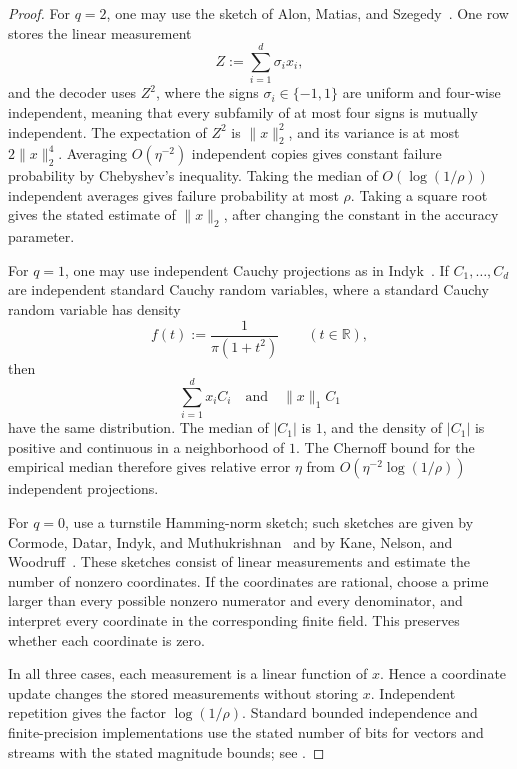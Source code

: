 \documentclass[11pt]{article}
\theoremstyle{definition}
\newcommand{\R}{\mathbb{R}}
\begin{document}
\begin{proof}
For \(q=2\), one may use the sketch of Alon, Matias, and
Szegedy~\cite{AlonMatiasSzegedy1999}.  One row stores the linear measurement
\[
 Z:=\sum_{i=1}^d\sigma_i x_i,
\]
and the decoder uses \(Z^2\), where the signs
\(\sigma_i\in\{-1,1\}\) are uniform and four-wise independent, meaning that
every subfamily of at most four signs is mutually independent.  The
expectation of \(Z^2\) is \(\lVert x\rVert_2^2\), and its variance is at most
\(2\lVert x\rVert_2^4\).  Averaging \(O(\eta^{-2})\) independent copies gives
constant failure probability by Chebyshev's inequality.  Taking the median of
\(O(\log(1/\rho))\) independent averages gives failure probability at most
\(\rho\).  Taking a square root gives the stated estimate of
\(\lVert x\rVert_2\), after changing the constant in the accuracy parameter.

For \(q=1\), one may use independent Cauchy projections as in
Indyk~\cite{Indyk2006}.  If \(C_1,\ldots,C_d\) are independent standard
Cauchy random variables, where a standard Cauchy random variable has density
\[
 f(t):=\frac{1}{\pi(1+t^2)}
 \qquad(t\in\R),
\]
then
\[
 \sum_{i=1}^d x_iC_i
 \quad\text{and}\quad
 \lVert x\rVert_1 C_1
\]
have the same distribution.  The median of \(|C_1|\) is \(1\), and the
density of \(|C_1|\) is positive and continuous in a neighborhood of \(1\).
The Chernoff bound for the empirical median therefore gives relative error
\(\eta\) from \(O(\eta^{-2}\log(1/\rho))\) independent projections.

For \(q=0\), use a turnstile Hamming-norm sketch; such sketches are given by
Cormode, Datar, Indyk, and
Muthukrishnan~\cite{CormodeDatarIndykMuthukrishnan2003} and by Kane, Nelson,
and Woodruff~\cite{KaneNelsonWoodruff2010Distinct}.  These sketches consist of
linear measurements and estimate the number of nonzero coordinates.  If the
coordinates are rational, choose a prime larger than every possible nonzero
numerator and every denominator, and interpret every coordinate in the
corresponding finite field.  This preserves whether each coordinate is zero.

In all three cases, each measurement is a linear function of \(x\).  Hence a
coordinate update changes the stored measurements without storing \(x\).
Independent repetition gives the factor \(\log(1/\rho)\).  Standard bounded
independence and finite-precision implementations use the stated number of
bits for vectors and streams with the stated magnitude bounds; see
\cite{Indyk2006,KaneNelsonWoodruff2010Norms,KaneNelsonWoodruff2010Distinct}.
\end{proof}
\end{document}
